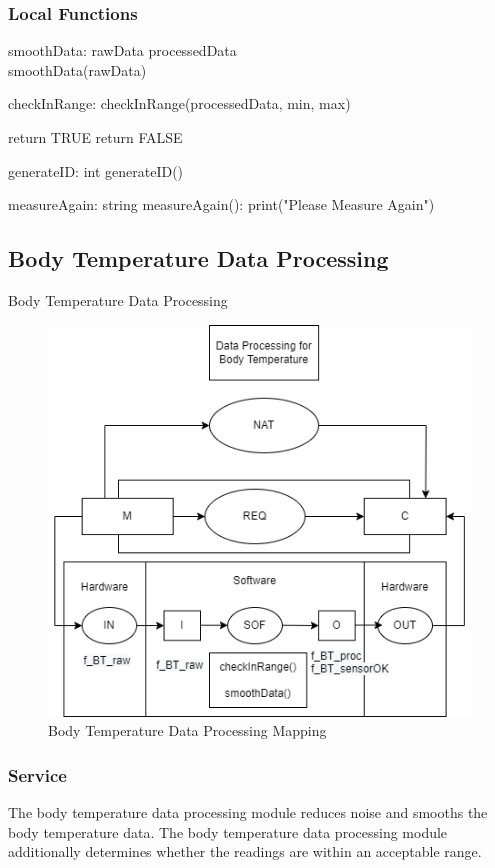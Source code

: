 \documentclass{article}
\newcounter{mnum}
\newcommand{\mthemnum}{M\themnum}
\begin{document}
\begin{description}
        \subsubsection* {Local Functions}
        smoothData: rawData \rightarrow processedData\\
        smoothData(rawData)
        
        checkInRange:
        checkInRange(processedData, min, max)
        \begin{algorithmic}
            \State 
            return TRUE
        \Else
            \State 
            return FALSE
        \EndIf 
        \end{algorithmic}
        
        generateID: \rightarrow int
        generateID()
        
        measureAgain: \rightarrow string
        measureAgain(): print("Please Measure Again")
        
        \newpage
    
    \subsection{Body Temperature Data Processing} 
    \item [\refstepcounter{mnum} \mthemnum \label{BT_DP}:] Body Temperature Data Processing
    
     \begin{figure}[!htb]
    	\centering
    	\includegraphics[width=0.5\linewidth]{mccharts-BTDataProc.drawio.png}
    	\caption{Body Temperature Data Processing Mapping}
    \end{figure}
    
    
        \subsubsection{Service}
        The body temperature data processing module reduces noise and smooths the body temperature data.  The body temperature data processing module additionally determines whether the readings are within an acceptable range.
        

\end{description}
\end{document}
